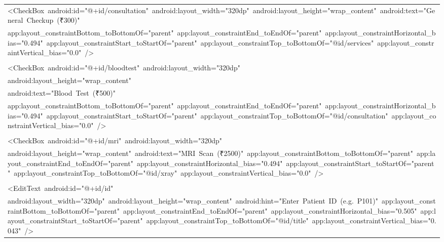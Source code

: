 \documentclass[a4paper,12pt]{article}
\begin{document}
\begin{longtable}{|p{}|}
{\ttfamily\small \textless{}CheckBox\ android:id="@+id/consultation"\ android:layout\_width="320dp"\ android:layout\_height="wrap\_content"\ android:text="General\ Checkup\ (₹300)"} \\
{\ttfamily\small app:layout\_constraintBottom\_toBottomOf="parent"\ app:layout\_constraintEnd\_toEndOf="parent"\ app:layout\_constraintHorizontal\_bias="0.494"\ app:layout\_constraintStart\_toStartOf="parent"\ app:layout\_constraintTop\_toBottomOf="@id/services"\ app:layout\_constraintVertical\_bias="0.0"\ /\textgreater{}} \\
\strut \\
{\ttfamily\small \textless{}CheckBox\ android:id="@+id/bloodtest"\ android:layout\_width="320dp"} \\
{\ttfamily\small android:layout\_height="wrap\_content"} \\
{\ttfamily\small android:text="Blood\ Test\ (₹500)"} \\
{\ttfamily\small app:layout\_constraintBottom\_toBottomOf="parent"\ app:layout\_constraintEnd\_toEndOf="parent"\ app:layout\_constraintHorizontal\_bias="0.494"\ app:layout\_constraintStart\_toStartOf="parent"\ app:layout\_constraintTop\_toBottomOf="@id/consultation"\ app:layout\_constraintVertical\_bias="0.0"\ /\textgreater{}} \\
\strut \\
{\ttfamily\small \textless{}CheckBox\ android:id="@+id/mri"\ android:layout\_width="320dp"} \\
{\ttfamily\small android:layout\_height="wrap\_content"\ android:text="MRI\ Scan\ (₹2500)"\ app:layout\_constraintBottom\_toBottomOf="parent"\ app:layout\_constraintEnd\_toEndOf="parent"\ app:layout\_constraintHorizontal\_bias="0.494"\ app:layout\_constraintStart\_toStartOf="parent"\ app:layout\_constraintTop\_toBottomOf="@id/xray"\ app:layout\_constraintVertical\_bias="0.0"\ /\textgreater{}} \\
\strut \\
{\ttfamily\small \textless{}EditText\ android:id="@+id/id"} \\
{\ttfamily\small android:layout\_width="320dp"\ android:layout\_height="wrap\_content"\ android:hint="Enter\ Patient\ ID\ (e.g.\ P101)"\ app:layout\_constraintBottom\_toBottomOf="parent"\ app:layout\_constraintEnd\_toEndOf="parent"\ app:layout\_constraintHorizontal\_bias="0.505"\ app:layout\_constraintStart\_toStartOf="parent"\ app:layout\_constraintTop\_toBottomOf="@id/title"\ app:layout\_constraintVertical\_bias="0.043"\ /\textgreater{}} \\

\end{longtable}
\end{document}
